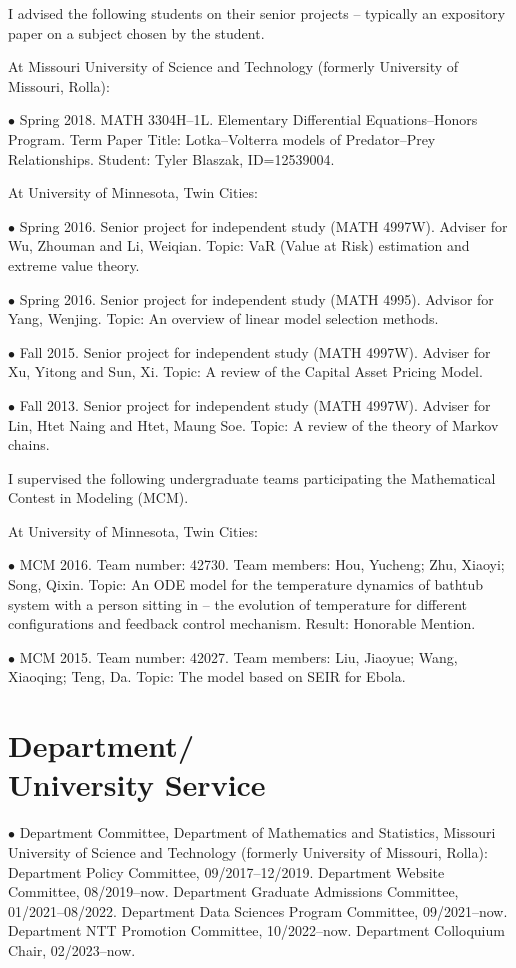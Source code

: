 \documentclass[margin,line]{res}
\begin{document}
\begin{resume}
I advised the following students on their senior projects --
typically an expository paper on a subject chosen by the student.

At Missouri University of Science and Technology (formerly University of Missouri, Rolla):

$\bullet$ Spring 2018. MATH 3304H--1L.
Elementary Differential Equations--Honors Program.
Term Paper Title: Lotka--Volterra models of Predator--Prey Relationships.
Student: Tyler Blaszak, ID=12539004.

At University of Minnesota, Twin Cities:

$\bullet$ Spring 2016. Senior project for independent study (MATH
4997W). Adviser for Wu, Zhouman and Li, Weiqian. Topic: VaR (Value
at Risk) estimation and extreme value theory.

$\bullet$ Spring 2016. Senior project for independent study (MATH
4995). Advisor for Yang, Wenjing. Topic: An overview of linear model selection methods.

$\bullet$ Fall 2015. Senior project for independent study (MATH
4997W). Adviser for Xu, Yitong and Sun, Xi. Topic: A review of the
Capital Asset Pricing Model.

$\bullet$ Fall 2013. Senior project for independent study (MATH
4997W). Adviser for Lin, Htet Naing and Htet, Maung Soe. Topic: A
review of the theory of Markov chains.

I supervised the following undergraduate teams participating the
Mathematical Contest in Modeling (MCM).

At University of Minnesota, Twin Cities:

$\bullet$ MCM 2016. Team number: 42730. Team members: Hou, Yucheng;
Zhu, Xiaoyi; Song, Qixin. Topic: An ODE model for the temperature
dynamics of bathtub system with a person sitting in -- the evolution
of temperature for different configurations and feedback control
mechanism. Result: Honorable Mention.

$\bullet$ MCM 2015. Team number: 42027. Team members: Liu, Jiaoyue;
Wang, Xiaoqing; Teng, Da. Topic: The model based on SEIR for Ebola.






\section{\sc Department/ \\ University Service}

$\bullet$ Department Committee, Department of Mathematics and Statistics, Missouri University
of Science and Technology (formerly University of Missouri, Rolla): 
Department Policy Committee, 09/2017--12/2019. 
Department Website Committee, 08/2019--now.
Department Graduate Admissions Committee, 01/2021--08/2022.
Department Data Sciences Program Committee, 09/2021--now.
Department NTT Promotion Committee, 10/2022--now.
Department Colloquium Chair, 02/2023--now.


\end{resume}
\end{document}

